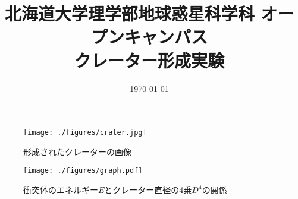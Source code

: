 \documentclass[a4paper]{ltjsarticle}
\begin{document}
\title{北海道大学理学部地球惑星科学科 オープンキャンパス\\クレーター形成実験}
\date{\today}
\maketitle
\thispagestyle{empty}
\begin{figure}[H]
    \centering
    \texttt{[image: ./figures/crater.jpg]}
    \caption{形成されたクレーターの画像}
\end{figure}
\begin{figure}[H]
    \centering
    \texttt{[image: ./figures/graph.pdf]}
    \caption{衝突体のエネルギー$E$とクレーター直径の4乗$D^4$の関係}
\end{figure}
\end{document}
